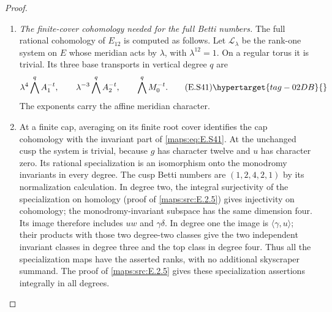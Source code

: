 \begin{proof}
\begin{enumerate}[label={$\langle1\rangle$\arabic*.},leftmargin=*]
\item \emph{The finite-cover cohomology needed for the full Betti numbers.}
The full rational cohomology of $E_{12}$ is computed as follows.
Let $\mathcal L_\lambda$ be the rank-one system on $E$
whose meridian acts by $\lambda$, with $\lambda^{12}=1$.
On a regular torus it is trivial. Its three base transports
in vertical degree $q$ are
\[
 \lambda^4\bigwedge^q A_1^{-t},\qquad
 \lambda^{-3}\bigwedge^q A_2^{-t},\qquad
                         \bigwedge^q M_0^{-t}.
 \tag{E.S41}\hypertarget{tag-02DB}{}\label{maps:eq:E.S41}
\]
The exponents carry the affine meridian character.

\item At a finite cap, averaging on its finite root cover
identifies the cap cohomology with the invariant part of
\eqref{maps:eq:E.S41}. At the unchanged cusp the system is trivial,
because $g$ has character twelve and $u$ has character zero.
Its rational specialization is an isomorphism onto the
monodromy invariants in every degree.  The cusp Betti numbers are
$(1,2,4,2,1)$ by its normalization calculation. In degree
two, the integral surjectivity of the specialization on homology (proof of \cref{maps:src:E.2.5}) gives injectivity on cohomology;
the monodromy-invariant subspace has the same dimension
four. Its image therefore includes $uw$ and $\gamma\delta$.
In degree one the image is $\langle\gamma,u\rangle$;
their products with those two degree-two classes give the
two independent invariant classes in degree three and
the top class in degree four. Thus all the specialization
maps have the asserted ranks, with no additional
skyscraper summand. The proof of \cref{maps:src:E.2.5} gives these specialization assertions integrally in all degrees.


\end{enumerate}
\end{proof}
